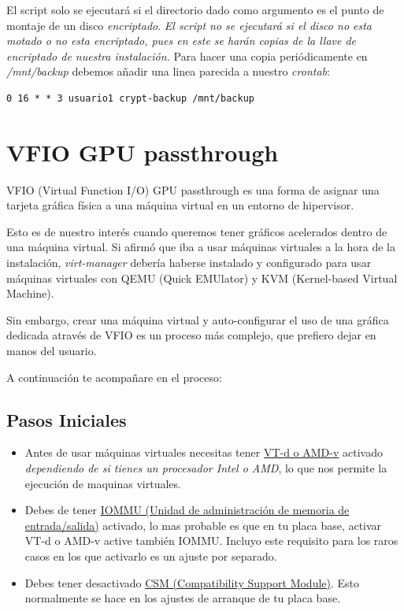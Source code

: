 \documentclass[12pt]{article}
\begin{document}
El script solo se ejecutará si el directorio dado como argumento es el punto de montaje de un disco \emph{encriptado}. \emph{El script no se ejecutará si el disco no esta motado o no esta encriptado, pues en este se harán copias de la llave de encriptado de nuestra instalación.} Para hacer una copia periódicamente en \emph{/mnt/backup} debemos añadir una linea parecida a nuestro \emph{crontab}:

\begin{verbatim}
0 16 * * 3 usuario1 crypt-backup /mnt/backup
\end{verbatim}

\section{VFIO GPU passthrough}

VFIO (Virtual Function I/O) GPU passthrough es una forma de asignar una tarjeta gráfica física a una máquina virtual en un entorno de hipervisor.

Esto es de nuestro interés cuando queremos tener gráficos acelerados dentro de una máquina virtual. Si afirmó que iba a usar máquinas virtuales a la hora de la instalación, \emph{virt-manager} debería haberse instalado y configurado para usar máquinas virtuales con QEMU (Quick EMUlator) y KVM (Kernel-based Virtual Machine).

Sin embargo, crear una máquina virtual y auto-configurar el uso de una gráfica dedicada através de VFIO es un proceso más complejo, que prefiero dejar en manos del usuario.

A continuación te acompañare en el proceso:

\subsection{Pasos Iniciales}

\begin{itemize}
\setlength\itemsep{-0.2em}
\item Antes de usar máquinas virtuales necesitas tener \href{https://en.wikipedia.org/wiki/X86_virtualization#Intel-VT-d}{VT-d o AMD-v} activado \emph{dependiendo de si tienes un procesador Intel o AMD}, lo que nos permite la ejecución de maquinas virtuales.
\item Debes de tener \href{https://en.wikipedia.org/wiki/Input\%E2\%80\%93output_memory_management_unit}{IOMMU (Unidad de administración de memoria de entrada/salida)} activado, lo mas probable es que en tu placa base, activar VT-d o AMD-v active también IOMMU. Incluyo este requisito para los raros casos en los que activarlo es un ajuste por separado.
\item Debes tener desactivado \href{https://en.wikipedia.org/wiki/UEFI#CSM_booting}{CSM (Compatibility Support Module)}. Esto normalmente se hace en los ajustes de arranque de tu placa base.
\end{itemize}
\end{document}
